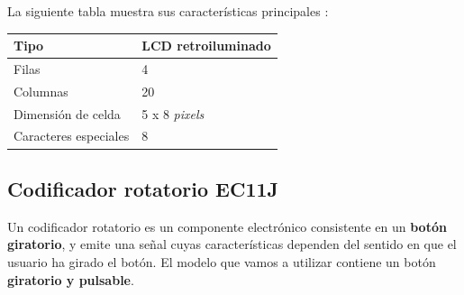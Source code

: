 \smallskip

La siguiente tabla muestra sus características principales \cite{datasheet_lcd}:

\smallskip

\begin{center}
	\begin{tabular}{|l|l|}
		\hline Tipo & \acrshort{LCD} retroiluminado \\ 
		\hline Filas & 4 \\ 
		\hline Columnas & 20 \\ 
		\hline Dimensión de celda & 5 x 8 \textit{pixels} \\ 
		\hline Caracteres especiales & 8 \\ 
		\hline 
	\end{tabular}
	\smallskip
\end{center} 

\smallskip

\subsection{Codificador rotatorio EC11J}
\label{subsec:rotary}

Un codificador rotatorio es un componente electrónico consistente en un \textbf{botón giratorio}, y emite una señal cuyas características dependen del sentido en que el usuario ha girado el botón. El modelo que vamos a utilizar contiene un botón \textbf{giratorio y pulsable}. \cite{rotary}

\smallskip


